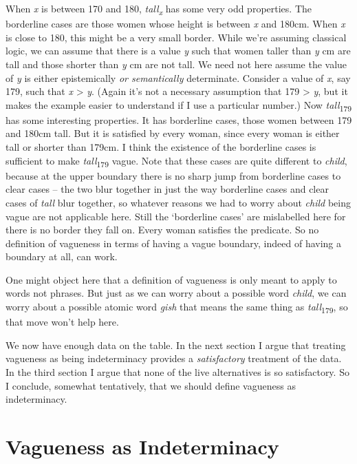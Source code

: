 When \textit{x} is between 170 and 180, \textit{tall}\textit{\textsubscript{x}} has some very odd properties. The borderline cases are those women whose height is between \textit{x} and 180cm. When \textit{x} is close to 180, this might be a very small border. While we're assuming classical logic, we can assume that there is a value \textit{y} such that women taller than \textit{y} cm are tall and those shorter than \textit{y} cm are not tall. We need not here assume the value of \textit{y} is either epistemically \textit{or semantically} determinate. Consider a value of \textit{x}, say 179, such that \textit{x} {\textgreater} \textit{y}. (Again it's not a necessary assumption that 179 {\textgreater} \textit{y}, but it makes the example easier to understand if I use a particular number.)  Now \textit{tall}\textsubscript{179} has some interesting properties. It has borderline cases, those women between 179 and 180cm tall. But it is satisfied by every woman, since every woman is either tall or shorter than 179cm. I think the existence of the borderline cases is sufficient to make \textit{tall}\textsubscript{179} vague. Note that these cases are quite different to \textit{child}, because at the upper boundary there is no sharp jump from borderline cases to clear cases -- the two blur together in just the way borderline cases and clear cases of \textit{tall} blur together, so whatever reasons we had to worry about \textit{child} being vague are not applicable here. Still the `borderline cases' are mislabelled here for there is no border they fall on. Every woman satisfies the predicate. So no definition of vagueness in terms of having a vague boundary, indeed of having a boundary at all, can work.

One might object here that a definition of vagueness is only meant to apply to words not phrases. But just as we can worry about a possible word \textit{child}, we can worry about a possible atomic word \textit{gish} that means the same thing as \textit{tall}\textsubscript{179}, so that move won't help here.

We now have enough data on the table. In the next section I argue that treating vagueness as being indeterminacy provides a \textit{satisfactory} treatment of the data. In the third section I argue that none of the live alternatives is so satisfactory. So I conclude, somewhat tentatively, that we should define vagueness as indeterminacy.

\section{Vagueness as Indeterminacy}

